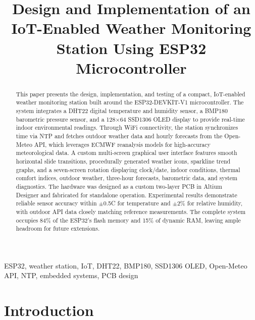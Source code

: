 \documentclass[conference]{IEEEtran}
\begin{document}
\title{Design and Implementation of an IoT-Enabled Weather Monitoring Station Using ESP32 Microcontroller}

\author{
}

\maketitle

\begin{abstract}
This paper presents the design, implementation, and testing of a compact, IoT-enabled weather monitoring station built around the ESP32-DEVKIT-V1 microcontroller. The system integrates a DHT22 digital temperature and humidity sensor, a BMP180 barometric pressure sensor, and a 128$\times$64 SSD1306 OLED display to provide real-time indoor environmental readings. Through WiFi connectivity, the station synchronizes time via NTP and fetches outdoor weather data and hourly forecasts from the Open-Meteo API, which leverages ECMWF reanalysis models for high-accuracy meteorological data. A custom multi-screen graphical user interface features smooth horizontal slide transitions, procedurally generated weather icons, sparkline trend graphs, and a seven-screen rotation displaying clock/date, indoor conditions, thermal comfort indices, outdoor weather, three-hour forecasts, barometric data, and system diagnostics. The hardware was designed as a custom two-layer PCB in Altium Designer and fabricated for standalone operation. Experimental results demonstrate reliable sensor accuracy within $\pm$0.5\textdegree C for temperature and $\pm$2\% for relative humidity, with outdoor API data closely matching reference measurements. The complete system occupies 84\% of the ESP32's flash memory and 15\% of dynamic RAM, leaving ample headroom for future extensions.
\end{abstract}

\begin{IEEEkeywords}
ESP32, weather station, IoT, DHT22, BMP180, SSD1306 OLED, Open-Meteo API, NTP, embedded systems, PCB design
\end{IEEEkeywords}

\section{Introduction}
\end{document}
